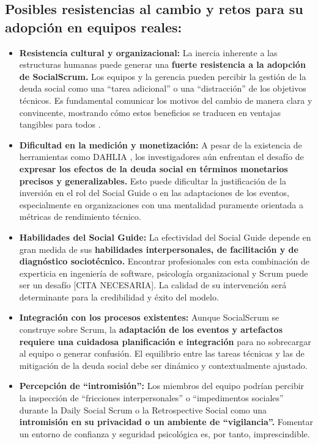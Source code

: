 \subsection{Posibles resistencias al cambio y retos para su adopción en equipos reales:}
\begin{itemize}
    \item \textbf{Resistencia cultural y organizacional:} La inercia inherente a las estructuras humanas puede generar una \textbf{fuerte resistencia a la adopción de SocialScrum.} Los equipos y la gerencia pueden percibir la gestión de la deuda social como una ``tarea adicional'' o una ``distracción'' de los objetivos técnicos. Es fundamental comunicar los motivos del cambio de manera clara y convincente, mostrando cómo estos beneficios se traducen en ventajas tangibles para todos \cite{saeeda2024nontechnicaldebt}.
    \item \textbf{Dificultad en la medición y monetización:} A pesar de la existencia de herramientas como DAHLIA \cite{falessi2021worstsmells}, los investigadores aún enfrentan el desafío de \textbf{expresar los efectos de la deuda social en términos monetarios precisos y generalizables.} Esto puede dificultar la justificación de la inversión en el rol del Social Guide o en las adaptaciones de los eventos, especialmente en organizaciones con una mentalidad puramente orientada a métricas de rendimiento técnico.
    \item \textbf{Habilidades del Social Guide:} La efectividad del Social Guide depende en gran medida de sus \textbf{habilidades interpersonales, de facilitación y de diagnóstico sociotécnico.} Encontrar profesionales con esta combinación de experticia en ingeniería de software, psicología organizacional y Scrum puede ser un desafío [CITA NECESARIA]. La calidad de su intervención será determinante para la credibilidad y éxito del modelo.
    \item \textbf{Integración con los procesos existentes:} Aunque SocialScrum se construye sobre Scrum, la \textbf{adaptación de los eventos y artefactos requiere una cuidadosa planificación e integración} para no sobrecargar al equipo o generar confusión. El equilibrio entre las tareas técnicas y las de mitigación de la deuda social debe ser dinámico y contextualmente ajustado.
    \item \textbf{Percepción de ``intromisión'':} Los miembros del equipo podrían percibir la inspección de ``fricciones interpersonales'' o ``impedimentos sociales'' durante la Daily Social Scrum o la Retrospective Social como una \textbf{intromisión en su privacidad o un ambiente de ``vigilancia''.} Fomentar un entorno de confianza y seguridad psicológica es, por tanto, imprescindible.
\end{itemize}

